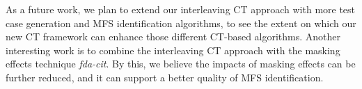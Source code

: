 \documentclass[journal,12pt,onecolumn,draftclsnofoot,]{IEEEtran}
\begin{document}
As a future work, we plan to extend our interleaving CT approach with more test case generation and MFS identification algorithms, to see the extent on which our new CT framework can enhance those different CT-based algorithms. Another interesting work is to combine the interleaving CT approach with the masking effects technique \emph{fda-cit}\cite{yilmaz2013reducing}. By this, we believe the impacts of masking effects can be further reduced, and it can support a better quality of MFS identification.






%
\end{document}
